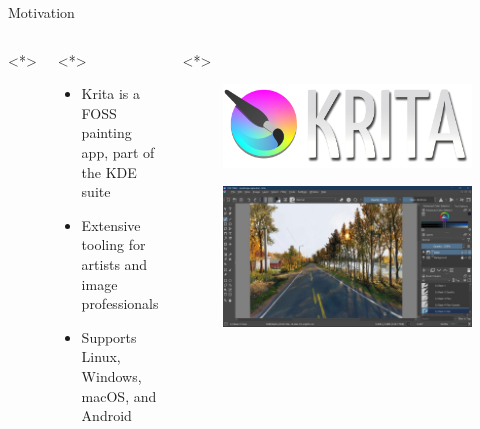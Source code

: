 \documentclass[final, aspectratio=169]{divoc}
\begin{document}
\begin{frame}{Motivation}
  \begin{columns}<*>
    \begin{column}{.70\textwidth}<*>
      \begin{itemize}[<*>]
        \item Krita is a FOSS painting app, part of the KDE suite
        \item Extensive tooling for artists and image professionals
        \item Supports Linux, Windows, macOS, and Android
      \end{itemize}
    \end{column}
    \begin{column}{.30\textwidth}<*>
      \begin{figure}
        \includegraphics[width=\columnwidth,keepaspectratio]{figures/krita_logo.png}
      \end{figure}
      \begin{figure}
        \includegraphics[width=\columnwidth,keepaspectratio]{figures/raghukamath.jpg}
      \end{figure}
    \end{column}
  \end{columns}
\end{frame}
\end{document}
